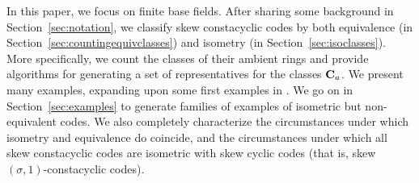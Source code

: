 \documentclass[11pt]{amsart}
\theoremstyle{plain}
\theoremstyle{definition}
\numberwithin{equation}{section}
\numberwithin{figure}{section}
\DeclareMathOperator{\id}{id}
\begin{document}








In this paper, we focus on finite base fields.  After sharing some background in Section~\ref{sec:notation}, we classify skew constacyclic codes by both equivalence (in Section~\ref{sec:countingequivclasses}) and isometry (in Section~\ref{sec:isoclasses}).   More specifically, we count the classes of their ambient rings and provide algorithms for generating a set of representatives for the classes  ${\bf C}_a$.  We present many examples, expanding upon some first examples in \cite{Pumpluen2025}.  We go on in Section~\ref{sec:examples} to generate families of examples of isometric but non-equivalent codes.  We also completely characterize the circumstances under which isometry and equivalence do coincide, and the circumstances under which all skew constacyclic codes are isometric with skew cyclic codes (that is, skew $(\sigma,1)$-constacyclic codes). %
\end{document}
